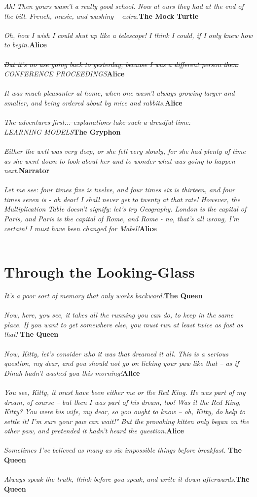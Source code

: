 \documentclass{hi-thesis}
\renewcommand{\quote}[2]{\noindent \emph{#2}\hfill{\bf #1}\\\\}
\begin{document}
\quote{The Mock Turtle}{Ah! Then yours wasn't a really good school. Now at ours they had at the end of the bill. French, music, and washing -- extra.}
\quote{Alice}{Oh, how I wish I could shut up like a telescope! I think I could, if I only knew how to begin.}
\quote{Alice}{\st{But it's no use going back to yesterday, because I was a different person then.}\\CONFERENCE PROCEEDINGS}
\quote{Alice}{It was much pleasanter at home, when one wasn't always growing larger and smaller, and being ordered about by mice and rabbits.}
\quote{The Gryphon}{\st{The adventures first... explanations take such a dreadful time.}\\LEARNING MODELS}
\quote{Narrator}{Either the well was very deep, or she fell very slowly, for she had plenty of time as she went down to look about her and to wonder what was going to happen next.}
\quote{Alice}{Let me see: four times five is twelve, and four times six is thirteen, and four times seven is - oh dear! I shall never get to twenty at that rate! However, the Multiplication Table doesn't signify: let's try Geography. London is the capital of Paris, and Paris is the capital of Rome, and Rome - no, that's all wrong, I'm certain! I must have been changed for Mabel!}



\chapter*{Through the Looking-Glass}
\quote{The Queen}{It's a poor sort of memory that only works backward.}
\quote{The Queen}{Now, here, you see, it takes all the running you can do, to keep in the same place. If you want to get somewhere else, you must run at least twice as fast as that! }
\quote{Alice}{Now, Kitty, let's consider who it was that dreamed it all. This is a serious question, my dear, and you should not go on licking your paw like that -- as if Dinah hadn't washed you this morning!}
\quote{Alice}{You see, Kitty, it must have been either me or the Red King. He was part of my dream, of course -- but then I was part of his dream, too! Was it the Red King, Kitty? You were his wife, my dear, so you ought to know -- oh, Kitty, do help to settle it! I'm sure your paw can wait!" But the provoking kitten only began on the other paw, and pretended it hadn't heard the question.}
\quote{The Queen}{Sometimes I've believed as many as six impossible things before breakfast. }
\quote{The Queen}{Always speak the truth, think before you speak, and write it down afterwards.}

\nocite{lookingglass,alice}
 

\end{document}
